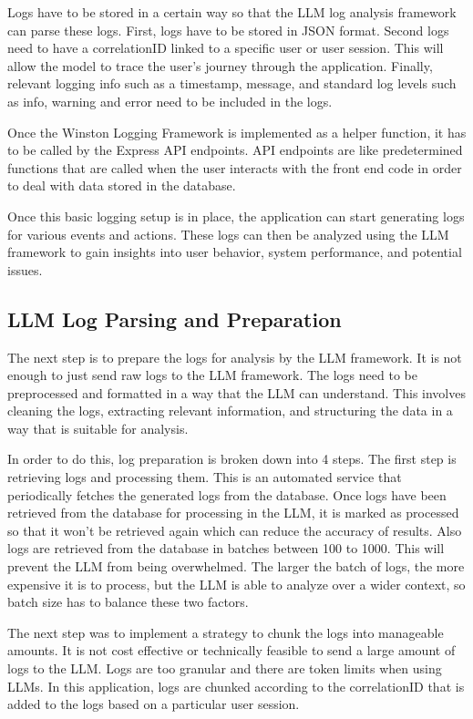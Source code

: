 \documentclass[sigconf]{acmart}
\begin{document}
Logs have to be stored in a certain way so that the LLM log analysis framework can parse these logs. First, logs have to be stored in JSON format. Second logs need to have a correlationID linked to a specific user or user session. This will allow the model to trace the user's journey through the application. Finally, relevant logging info such as a timestamp, message, and standard log levels such as info, warning and error need to be included in the logs. 

Once the Winston Logging Framework is implemented as a helper function, it has to be called by the Express API endpoints. API endpoints are like predetermined functions that are called when the user interacts with the front end code in order to deal with data stored in the database.

Once this basic logging setup is in place, the application can start generating logs for various events and actions. These logs can then be analyzed using the LLM framework to gain insights into user behavior, system performance, and potential issues.

\subsection{LLM Log Parsing and Preparation}

The next step is to prepare the logs for analysis by the LLM framework. It is not enough to just send raw logs to the LLM framework. The logs need to be preprocessed and formatted in a way that the LLM can understand. This involves cleaning the logs, extracting relevant information, and structuring the data in a way that is suitable for analysis.

In order to do this, log preparation is broken down into 4 steps. The first step is retrieving logs and processing them. This is an automated service that periodically fetches the generated logs from the database. Once logs have been retrieved from the database for processing in the LLM, it is marked as processed so that it won't be retrieved again which can reduce the accuracy of results. Also logs are retrieved from the database in batches between 100 to 1000. This will prevent the LLM from being overwhelmed. The larger the batch of logs, the more expensive it is to process, but the LLM is able to analyze over a wider context, so batch size has to balance these two factors.

The next step was to implement a strategy to chunk the logs into manageable amounts. It is not cost effective or technically feasible to send a large amount of logs to the LLM. Logs are too granular and there are token limits when using LLMs. In this application, logs are chunked according to the correlationID that is added to the logs based on a particular user session.
\end{document}

